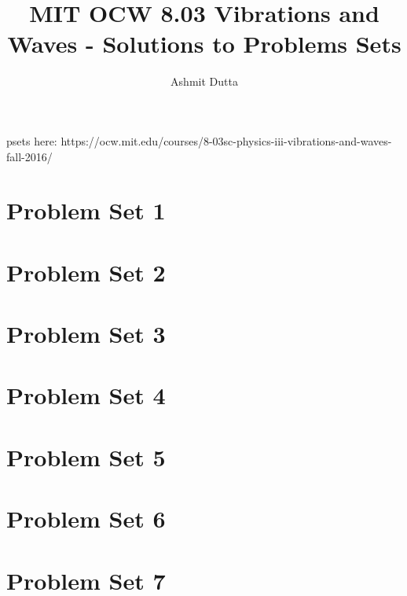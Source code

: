 \documentclass{article}
\title{MIT OCW 8.03 Vibrations and Waves - Solutions to Problems Sets}
\author{Ashmit Dutta}
\date{}
\begin{document}
\maketitle
psets here: https://ocw.mit.edu/courses/8-03sc-physics-iii-vibrations-and-waves-fall-2016/
\section*{Problem Set 1}







\newpage
\section*{Problem Set 2}






\newpage
\section*{Problem Set 3}






\newpage
\section*{Problem Set 4}





\newpage
\section*{Problem Set 5}






\newpage
\section*{Problem Set 6}





\newpage 
\section*{Problem Set 7}



\end{document}
